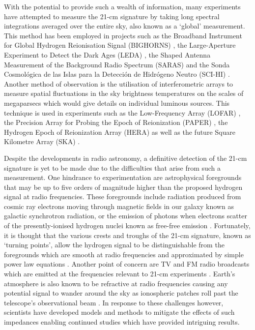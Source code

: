With the potential to provide such a wealth of information, many experiments have attempted to measure the 21-cm signature by taking long spectral integrations averaged over the entire sky, also known as a ‘global’ measurement. This method has been employed in projects such as the Broadband Instrument for Global Hydrogen Reionisation Signal (BIGHORNS) \citep{bighorns}, the Large-Aperture Experiment to Detect the Dark Ages (LEDA) \citep{leda}, the Shaped Antenna Measurement of the Background Radio Spectrum (SARAS) \citep{saras} and the Sonda Cosmol\'{o}gica de las Islas para la Detecci\'{o}n de Hidr\'{o}geno Neutro (SCI-HI) \citep{scihi}. Another method of observation is the utilisation of interferometric arrays to measure spatial fluctuations in the sky brightness temperatures on the scales of megaparsecs which would give details on individual luminous sources. This technique is used in experiments such as the Low-Frequency Array (LOFAR) \citep{lofar}, the Precision Array for Probing the Epoch of Reionization (PAPER) \citep{paper}, the Hydrogen Epoch of Reionization Array (HERA) \citep{hera} as well as the future Square Kilometre Array (SKA) \citep{ska}.

Despite the developments in radio astronomy, a definitive detection of the 21-cm signature is yet to be made due to the difficulties that arise from such a measurement. One hindrance to experimentation are astrophysical foregrounds that may be up to five orders of magnitude higher than the proposed hydrogen signal at radio frequencies. These foregrounds include radiation produced from cosmic ray electrons moving through magnetic fields in our galaxy known as galactic synchrotron radiation, or the emission of photons when electrons scatter of the presently-ionised hydrogen nuclei known as free-free emission \citep{foregrounds,edges}. Fortunately, it is thought that the various crests and troughs of the 21-cm signature, known as ‘turning points’, allow the hydrogen signal to be distinguishable from the foregrounds which are smooth at radio frequencies and approximated by simple power law equations \citep{edgesNature}. Another point of concern are TV and FM radio broadcasts which are emitted at the frequencies relevant to 21-cm experiments \citep{reach}. Earth’s atmosphere is also known to be refractive at radio frequencies causing any potential signal to wander around the sky as ionospheric patches roll past the telescope’s observational beam \citep{lofar}. In response to these challenges however, scientists have developed models and methods to mitigate the effects of such impedances enabling continued studies which have provided intriguing results.


